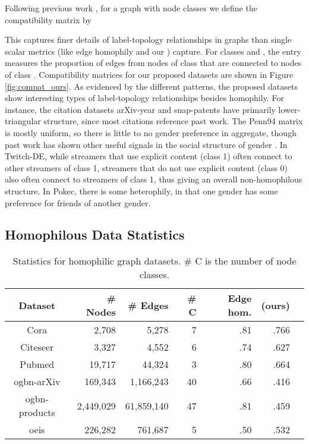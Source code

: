 \documentclass[sigconf, balance=false]{acmart}
\begin{document}
Following previous work \cite{zhu2020beyond}, for a graph  with  node classes we define the  compatibility matrix  by


This captures finer details of label-topology relationships in graphs than single scalar metrics (like edge homophily and our ) capture. For classes  and , the entry  measures the proportion of edges from nodes of class  that are connected to nodes of class .
Compatibility matrices for our proposed datasets are shown in Figure \ref{fig:compat_ours}. As evidenced by the different patterns, the proposed datasets show interesting types of label-topology relationships besides homophily. For instance, the citation datasets arXiv-year and snap-patents have primarily lower-triangular structure, since most citations reference past work. The Penn94 matrix is mostly uniform, so there is little to no gender preference in aggregate, though past work has shown other useful signals in the social structure of gender \cite{altenburger2018monophily}. In Twitch-DE, while streamers that use explicit content (class 1) often connect to other streamers of class 1, streamers that do not use explicit content (class 0) also often connect to streamers of class 1, thus giving an overall non-homophilous structure. In Pokec, there is some heterophily, in that one gender has some preference for friends of another gender.



\subsection{Homophilous Data Statistics}\label{sec:homophilous_stats}

\begin{table}[h]
    \centering
    \caption{Statistics for homophilic graph datasets. \# C is the number of node classes.}
    \label{tab:homophilic_stats}
    {\footnotesize
    \begin{tabular}{crrrrrr}
    \toprule
    Dataset & \# Nodes & \# Edges &   \# C &  Edge hom. &  (ours) \\
    \midrule
         Cora & 2,708 & 5,278 &  7 &  .81 & .766\\
         Citeseer & 3,327 & 4,552 &  6 &  .74 & .627\\
         Pubmed & 19,717 & 44,324 &  3 &  .80 & .664\\
         ogbn-arXiv & 169,343 & 1,166,243 &  40 &  .66 & .416\\
         ogbn-products & 2,449,029 & 61,859,140 &  47 &  .81 & .459 \\
         oeis & 226,282 & 761,687  & 5 &  .50 & .532 \\
    \bottomrule
    \end{tabular}
    }
\end{table}
\end{document}
